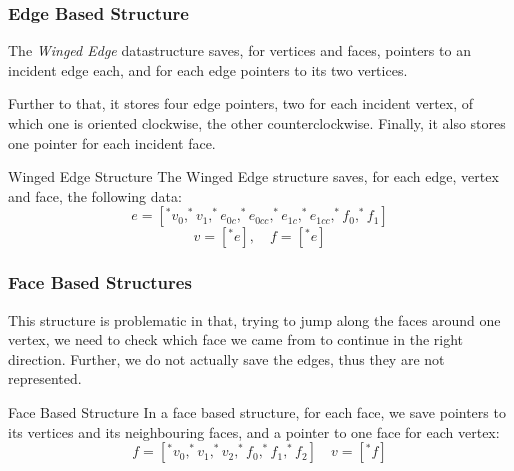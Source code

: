 \documentclass{panikzettel}
\begin{document}
\subsubsection*{Edge Based Structure}

\begin{halfboxl}
The \emph{Winged Edge} datastructure saves, for vertices and faces, pointers to an incident edge each, and for each edge pointers to its two vertices.

Further to that, it stores four edge pointers, two for each incident vertex, of which one is oriented clockwise, the other counterclockwise. Finally, it also stores one pointer for each incident face.
\end{halfboxl}%
\begin{halfboxr}
\vspace{-\baselineskip}
\begin{defi}{Winged Edge Structure}
The Winged Edge structure saves, for each edge, vertex and face, the following data:
$$e = [^*v_0,^*v_1,^*e_{0c},^*e_{0cc},^*e_{1c},^*e_{1cc},^*f_0,^*f_1]$$
$$v=[^*e], \quad f=[^*e]$$
\end{defi}
\end{halfboxr}

\begin{halfboxl}
\subsubsection*{Face Based Structures}

This structure is problematic in that, trying to jump along the faces around one vertex, we need to check which face we came from to continue in the right direction. Further, we do not actually save the edges, thus they are not represented.
\end{halfboxl}%
\begin{halfboxr}
\vspace{-\baselineskip}
\begin{defi}{Face Based Structure}
In a face based structure, for each face, we save pointers to its vertices and its neighbouring faces, and a pointer to one face for each vertex:
$$f=[^*v_0,^*v_1,^*v_2,^*f_0,^*f_1,^*f_2] \quad v = [^*f]$$
\end{defi}
\end{halfboxr}
\end{document}
